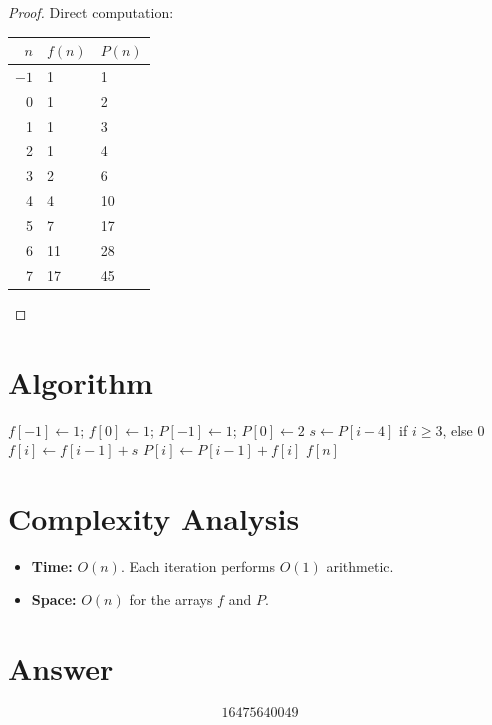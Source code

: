 \documentclass[12pt]{article}
\begin{document}
\begin{proof}
Direct computation:
\begin{center}
\begin{tabular}{rll}
\toprule
$n$ & $f(n)$ & $P(n)$ \\
\midrule
$-1$ & 1 & 1 \\
0 & 1 & 2 \\
1 & 1 & 3 \\
2 & 1 & 4 \\
3 & 2 & 6 \\
4 & 4 & 10 \\
5 & 7 & 17 \\
6 & 11 & 28 \\
7 & 17 & 45 \\
\bottomrule
\end{tabular}
\end{center}
\end{proof}

\section{Algorithm}

\begin{algorithm}[H]
\caption{Compute $f(n)$ via prefix sums}
\begin{algorithmic}[1]
\State $f[-1] \gets 1$;\; $f[0] \gets 1$;\; $P[-1] \gets 1$;\; $P[0] \gets 2$
    \State $s \gets P[i-4]$ if $i \ge 3$, else $0$
    \State $f[i] \gets f[i-1] + s$
    \State $P[i] \gets P[i-1] + f[i]$
\EndFor
\State \Return $f[n]$
\end{algorithmic}
\end{algorithm}

\section{Complexity Analysis}

\begin{itemize}
\item \textbf{Time:} $O(n)$. Each iteration performs $O(1)$ arithmetic.
\item \textbf{Space:} $O(n)$ for the arrays $f$ and $P$.
\end{itemize}

\section{Answer}

\[
\boxed{16475640049}
\]
\end{document}
